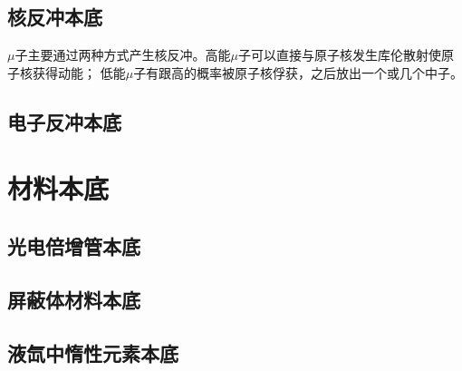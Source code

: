 \subsection{核反冲本底}
\label{sec:muon_nr}

$\mu$子主要通过两种方式产生核反冲。高能$\mu$子可以直接与原子核发生库伦散射使原子核获得动能；
低能$\mu$子有跟高的概率被原子核俘获，之后放出一个或几个中子。

\subsection{电子反冲本底}

\section{材料本底}

\subsection{光电倍增管本底}
\label{sec:pmt_background}

\subsection{屏蔽体材料本底}

\subsection{液氙中惰性元素本底}
